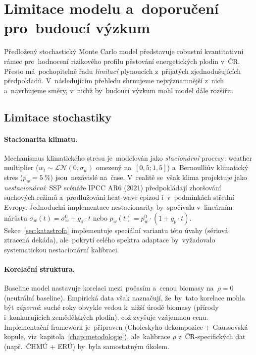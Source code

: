 \section{Limitace modelu a~doporučení pro~budoucí výzkum}
\label{sec:limitace}

Předložený stochastický Monte Carlo model představuje robustní
kvantitativní rámec pro~hodnocení rizikového profilu pěstování
energetických plodin v~ČR. Přesto má~pochopitelně řadu \emph{limitací}
plynoucích z~přijatých zjednodušujících předpokladů. V~následujícím
přehledu shrnujeme nejvýznamnější z~nich a~navrhujeme směry,
v~nichž by~budoucí výzkum mohl model dále rozšířit.

\subsection{Limitace stochastiky}
\label{subsec:lim-stoch}

\paragraph{Stacionarita klimatu.}
Mechanismus klimatického stresu je~modelován jako \emph{stacionární}
procesy: weather multiplier ($w_t \sim \mathcal{LN}(0, \sigma_w)$
omezený na~$[0{,}5; 1{,}5]$) a~Bernoulliův klimatický stres
($p_w = 5~\%$) jsou~nezávislé na~čase. V~realitě se~však klima
projektuje jako \emph{nestacionární}: SSP scénáře IPCC AR6 (2021) předpokládají
zhoršování suchových režimů a~prodlužování heat-wave epizod
i~v~podmínkách střední Evropy. Jednoduchá implementace nestacionarity by~spočívala
v~lineárním nárůstu $\sigma_w(t) = \sigma_w^0 + g_\sigma \cdot t$
nebo $p_w(t) = p_w^0 \cdot (1 + g_p \cdot t)$. Sekce~\ref{sec:katastrofa}
implementuje speciální variantu této úvahy (sériová ztracená dekáda),
ale~pokrytí celého spektra adaptace by~vyžadovalo systematickou
nestacionární kalibraci.

\paragraph{Korelační struktura.}
Baseline model nastavuje korelaci mezi~počasím a~cenou
biomasy na~$\rho = 0$ (neutrální baseline). Empirická data však naznačují,
že~by~tato korelace mohla být \emph{záporná}: suché roky obvykle vedou
k~nižší úrodě biomasy (přírody i~konkurujících zemědělských plodin),
což zvyšuje vzájemnou cenu. Implementační framework je~připraven
(Choleskyho dekompozice + Gaussovská kopule, viz~kapitola~\ref{chap:metodologie}),
ale~kalibrace $\rho$ z~ČR-specifických dat (např.~ČHMÚ + ERÚ)
by~byla samostatným úkolem.

